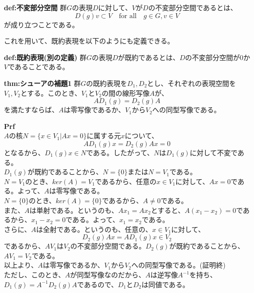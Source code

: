 \documentclass[a4paper,11pt]{jsarticle}
\begin{document}
\begin{itembox}[l]{\textbf{def:不変部分空間}}
    群$G$の表現$D$に対して、$V$が$D$の不変部分空間であるとは、
    \begin{equation}
        D(g)v \subset V \quad \text{for all} \quad g \in G, v \in V
    \end{equation}
    が成り立つことである。
\end{itembox}
これを用いて、既約表現を以下のようにも定義できる。\\
\begin{itembox}[l]{\textbf{def:既約表現(別の定義)}}
    群$G$の表現$D$が既約であるとは、$D$の不変部分空間が$0$か$V$であることである。
\end{itembox}

\begin{itembox}[l]{\textbf{thm:シューアの補題1}}
    群$G$の既約表現を${D_1},{D_2}$とし、それぞれの表現空間を${V_1},{V_2}$とする。このとき、${V_1}$と${V_2}$の間の線形写像$A$が、
    \begin{equation}
        AD_1(g) = D_2(g)A
    \end{equation}
    を満たすならば、$A$は零写像であるか、$V_1$から$V_2$への同型写像である。
\end{itembox}
\textbf{Prf}\\
$A$の核$N=\{x \in V_1 | Ax = 0\}$に属する元$x$について、
\begin{equation}
    AD_1(g)x = D_2(g)Ax = 0
\end{equation}
となるから、$D_1(g)x \in N$である。したがって、$N$は$D_1(g)$に対して不変である。\\
$D_1(g)$が既約であることから、$N=\{0\}$または$N=V_1$である。\\
$N=V_1$のとき、$ker(A)=V_1$であるから、任意の$x \in V_1$に対して、$Ax=0$である。よって、$A$は零写像である。\\
$N=\{0\}$のとき、$ker(A)=\{0\}$であるから、$A\neq 0$である。\\
また、$A$は単射である。というのも、$Ax_1=Ax_2$とすると、$A(x_1-x_2)=0$であるから、$x_1-x_2=0$である。よって、$x_1=x_2$である。\\
さらに、$A$は全射である。というのも、任意の、$x \in V_1$に対して、
\begin{equation}
    D_2(g)Ax = AD_1(g)x\in V_2
\end{equation}
であるから、$AV_1$は$V_2$の不変部分空間である。$D_2(g)$が既約であることから、$AV_1=V_2$である。\\
以上より、$A$は零写像であるか、$V_1$から$V_2$への同型写像である。(証明終)\\
ただし、このとき、$A$が同型写像なのだから、$A$は逆写像$A^{-1}$を持ち、$D_1(g)=A^{-1}D_2(g)A$であるので、$D_1$と$D_2$は同値である。\\
\end{document}
